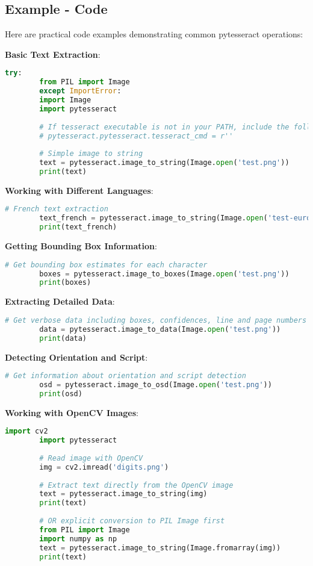\documentclass{article}
\begin{document}
	\subsection{Example - Code}
	Here are practical code examples demonstrating common pytesseract operations:
	
	\textbf{Basic Text Extraction}:
	\begin{lstlisting}[language=Python]
		try:
		from PIL import Image
		except ImportError:
		import Image
		import pytesseract
		
		# If tesseract executable is not in your PATH, include the following:
		# pytesseract.pytesseract.tesseract_cmd = r''
		
		# Simple image to string
		text = pytesseract.image_to_string(Image.open('test.png'))
		print(text)
	\end{lstlisting}
	
	\textbf{Working with Different Languages}:
	\begin{lstlisting}[language=Python]
		# French text extraction
		text_french = pytesseract.image_to_string(Image.open('test-european.jpg'), lang='fra')
		print(text_french)
	\end{lstlisting}
	
	\textbf{Getting Bounding Box Information}:
	\begin{lstlisting}[language=Python]
		# Get bounding box estimates for each character
		boxes = pytesseract.image_to_boxes(Image.open('test.png'))
		print(boxes)
	\end{lstlisting}
	
	\textbf{Extracting Detailed Data}:
	\begin{lstlisting}[language=Python]
		# Get verbose data including boxes, confidences, line and page numbers
		data = pytesseract.image_to_data(Image.open('test.png'))
		print(data)
	\end{lstlisting}
	
	\textbf{Detecting Orientation and Script}:
	\begin{lstlisting}[language=Python]
		# Get information about orientation and script detection
		osd = pytesseract.image_to_osd(Image.open('test.png'))
		print(osd)
	\end{lstlisting}
	
	\textbf{Working with OpenCV Images}:
	\begin{lstlisting}[language=Python]
		import cv2
		import pytesseract
		
		# Read image with OpenCV
		img = cv2.imread('digits.png')
		
		# Extract text directly from the OpenCV image
		text = pytesseract.image_to_string(img)
		print(text)
		
		# OR explicit conversion to PIL Image first
		from PIL import Image
		import numpy as np
		text = pytesseract.image_to_string(Image.fromarray(img))
		print(text)
	\end{lstlisting}
	
\end{document}
